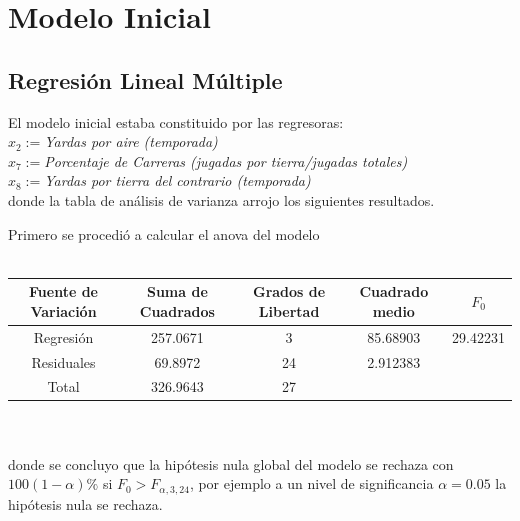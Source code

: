 \documentclass[11pt]{beamer}
\begin{document}
\section{Modelo Inicial}

\subsection{Regresión Lineal Múltiple}

\begin{frame}{}
\end{frame}

\begin{frame}
El modelo inicial estaba constituido por las regresoras:\\


$x_{2}:=$\textit{Yardas por aire (temporada)} \\
$x_{7}:=$\textit{Porcentaje de Carreras (jugadas por tierra/jugadas totales)} \\
$x_{8}:=$\textit{Yardas por tierra del contrario (temporada)}\\


donde la tabla de análisis de varianza arrojo los siguientes resultados.

\end{frame}

\begin{frame}
Primero se procedió a calcular el anova del modelo\\~\\
\begin{adjustbox}{width=1\textwidth}
\begin{tabular}{ccccc}
\hline 
\textbf{Fuente de Variación} & \textbf{Suma de Cuadrados} & \textbf{Grados de Libertad} & \textbf{Cuadrado medio} & $F_{0}$ \\ 
\hline 
Regresión & 257.0671 & 3 & 85.68903 & 29.42231 \\ 
Residuales & 69.8972 & 24 & 2.912383 &  \\ 
Total & 326.9643 & 27 &  &  \\ 
\hline 
\end{tabular} 
\end{adjustbox}\\~\\
donde se concluyo que la hipótesis nula global del modelo se rechaza con $100(1-\alpha)\%$ si $F_{0}>F_{\alpha,3,24}$, por ejemplo a un nivel de significancia $\alpha=0.05$ la hipótesis nula se rechaza.
\end{frame}
\end{document}
